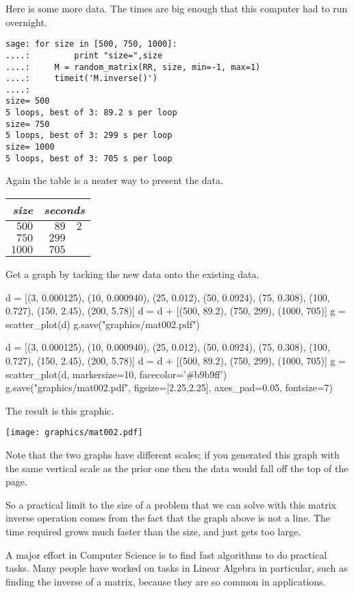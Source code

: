 Here is some more data.
The times are big enough that this computer had to run overnight.
\begin{lstlisting}
sage: for size in [500, 750, 1000]:                             
....:         print "size=",size
....:     M = random_matrix(RR, size, min=-1, max=1)
....:     timeit('M.inverse()')
....: 
size= 500
5 loops, best of 3: 89.2 s per loop
size= 750
5 loops, best of 3: 299 s per loop
size= 1000
5 loops, best of 3: 705 s per loop
\end{lstlisting}
Again the table is a neater way to present the data.
\begin{center}
  \begin{tabular}{r|r@{.}l}
    \textit{size}     &\multicolumn{2}{c}{\textit{seconds}}  \\  \hline
    $500$       &$89$ &$2$ \\
    $750$       &$299$ &   \\
    $1000$      &$705$ &   
  \end{tabular}
\end{center}
Get a graph by tacking the new data onto the existing data.
\begin{sageoutput}[d,0,3]
d = [(3, 0.000125), (10, 0.000940), (25, 0.012),  
     (50, 0.0924), (75, 0.308), (100, 0.727), 
     (150, 2.45), (200, 5.78)]
d = d + [(500, 89.2), (750, 299), (1000, 705)]
g = scatter_plot(d)                           
g.save("graphics/mat002.pdf")                      
\end{sageoutput}
\begin{sagesilent}
d = [(3, 0.000125), (10, 0.000940), (25, 0.012),  
     (50, 0.0924), (75, 0.308), (100, 0.727), 
     (150, 2.45), (200, 5.78)]
d = d + [(500, 89.2), (750, 299), (1000, 705)]
g = scatter_plot(d, markersize=10, facecolor='#b9b9ff')
g.save("graphics/mat002.pdf", figsize=[2.25,2.25], axes_pad=0.05, fontsize=7)              
\end{sagesilent}
The result is this graphic.
\begin{center}
  \texttt{[image: graphics/mat002.pdf]}
\end{center}
Note that the two graphs have different scales;
if you generated this graph with the same vertical scale as the prior one
then the data would fall off the top of the page.

So a practical limit to the size of a problem that we can solve with
this matrix inverse operation comes from the fact that the graph above is
not a line.
The time required grows much faster than the size, and just gets too large. 

A major effort in Computer Science is to find fast algorithms to 
do practical tasks.
Many people have worked on tasks in Linear Algebra in particular,
such as finding the inverse of a matrix, because
they are so common in applications.

\endinput


TODO:
